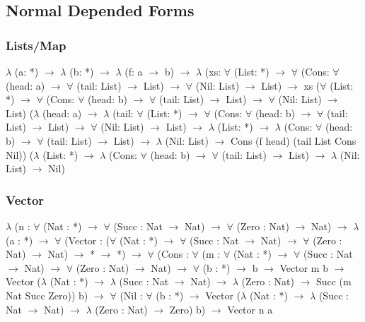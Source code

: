 \documentclass[11pt,oneside]{article}
\begin{document}
\newpage
\subsection*{Normal Depended Forms}
\vspace{1cm}
\subsubsection*{Lists/Map}
{\selectfont
\vspace{0.5cm}
$\lambda$ (a: *) $\rightarrow$ $\lambda$ (b: *) $\rightarrow$ $\lambda$ (f: a $\rightarrow$ b) $\rightarrow$ $\lambda$ (xs: $\forall$ (List: *)
$\rightarrow$ $\forall$ (Cons: $\forall$ (head: a) $\rightarrow$ $\forall$ (tail: List) $\rightarrow$ List) $\rightarrow$ $\forall$ (Nil: List) $\rightarrow$ List)
$\rightarrow$ xs ($\forall$ (List: *) $\rightarrow$ $\forall$ (Cons: $\forall$ (head: b) $\rightarrow$ $\forall$ (tail: List) $\rightarrow$ List)
$\rightarrow$ $\forall$ (Nil: List) $\rightarrow$ List) ($\lambda$ (head: a) $\rightarrow$ $\lambda$ (tail: $\forall$ (List: *) $\rightarrow$
$\forall$ (Cons: $\forall$ (head: b) $\rightarrow$ $\forall$ (tail: List) $\rightarrow$ List) $\rightarrow$ $\forall$ (Nil: List)
$\rightarrow$ List) $\rightarrow$ $\lambda$ (List: *) $\rightarrow$ $\lambda$ (Cons: $\forall$ (head: b) $\rightarrow$ $\forall$
(tail: List) $\rightarrow$ List) $\rightarrow$ $\lambda$ (Nil: List) $\rightarrow$ Cons (f head) (tail List Cons Nil))
($\lambda$ (List: *) $\rightarrow$ $\lambda$ (Cons: $\forall$ (head: b) $\rightarrow$ $\forall$ (tail: List) $\rightarrow$
List) $\rightarrow$ $\lambda$ (Nil: List) $\rightarrow$ Nil)
}

\subsubsection*{Vector}
{\selectfont
\vspace{0.5cm}
$\lambda$ (n : $\forall$ (Nat : *) $\rightarrow$ $\forall$ (Succ : Nat $\rightarrow$ Nat) $\rightarrow$ $\forall$ (Zero : Nat) $\rightarrow$ Nat) $\rightarrow$ $\lambda$ (a : *) $\rightarrow$ $\forall$ (Vector : ($\forall$ (Nat : *) $\rightarrow$ $\forall$ (Succ : Nat $\rightarrow$ Nat) $\rightarrow$ $\forall$ (Zero : Nat) $\rightarrow$ Nat) $\rightarrow$ * $\rightarrow$ *) $\rightarrow$ $\forall$ (Cons : $\forall$ (m : $\forall$ (Nat : *) $\rightarrow$ $\forall$ (Succ : Nat $\rightarrow$ Nat) $\rightarrow$ $\forall$ (Zero : Nat) $\rightarrow$ Nat) $\rightarrow$ $\forall$ (b : *) $\rightarrow$ b $\rightarrow$ Vector m b $\rightarrow$ Vector ($\lambda$ (Nat : *) $\rightarrow$ $\lambda$ (Succ : Nat $\rightarrow$ Nat) $\rightarrow$ $\lambda$ (Zero : Nat) $\rightarrow$ Succ (m Nat Succ Zero)) b) $\rightarrow$ $\forall$ (Nil : $\forall$ (b : *) $\rightarrow$ Vector ($\lambda$ (Nat : *) $\rightarrow$ $\lambda$ (Succ : Nat $\rightarrow$ Nat) $\rightarrow$ $\lambda$ (Zero : Nat) $\rightarrow$ Zero) b) $\rightarrow$ Vector n a
}
\end{document}
